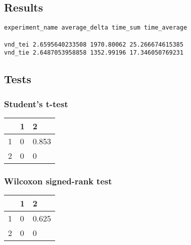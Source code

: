 \subsection{Results}

\begin{lstlisting}
experiment_name average_delta time_sum time_average

vnd_tei 2.6595640233508 1970.80062 25.266674615385
vnd_tie 2.6487053958858 1352.99196 17.346050769231
\end{lstlisting}

\newpage

\subsection{Tests}

\subsubsection{Student's t-test}

\begin{table}[h]
\begin{tabular}{|l||l|l|}
\hline
 & 1 & 2 \\ \hline
\hline
1 & 0 & 0.853 \\ \hline
2 & 0 & 0 \\ \hline
\end{tabular}
\end{table}

\subsubsection{Wilcoxon signed-rank test}

\begin{table}[h]
\begin{tabular}{|l||l|l|}
\hline
 & 1 & 2 \\ \hline
\hline
1 & 0 & 0.625 \\ \hline
2 & 0 & 0 \\ \hline
\end{tabular}
\end{table}

\newpage
